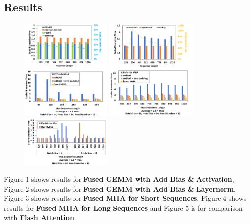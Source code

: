 \documentclass{article}
\begin{document}
\subsection*{Results}
\begin{figure}[h]
    \centering
    \includegraphics[width=0.4\textwidth]{addBiasAndLayerNorm.png}
    \includegraphics[width=0.4\textwidth]{addBiassGEMM.png}
    \includegraphics[width=0.4\textwidth]{mhsForShort.png}
    \includegraphics[width=0.4\textwidth]{mhsForLong.png}
    \includegraphics[width=0.4\textwidth]{compare.png}
    \label{fig:results}
    \vspace{-0.5cm}
\end{figure}
Figure 1 shows results for \textbf{Fused GEMM with Add Bias \& Activation}, Figure 2 shows results for \textbf{Fused GEMM with Add Bias \& Layernorm}, Figure 3 shows results for \textbf{Fused MHA for Short Sequences}, Figure 4 shows results for \textbf{Fused MHA for Long Sequences} and Figure 5 is for comparison with \textbf{Flash Attention}
\end{document}
